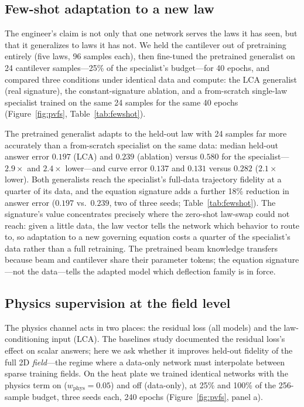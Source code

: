 \documentclass[11pt,a4paper]{article}
\begin{document}
\subsection{Few-shot adaptation to a new law}\label{sec:fewshot}

The engineer's claim is not only that one network serves the laws it has
seen, but that it generalizes to laws it has not. We held the cantilever
out of pretraining entirely (five laws, 96 samples each), then fine-tuned
the pretrained generalist on 24 cantilever samples---25\% of the
specialist's budget---for 40 epochs, and compared three conditions under
identical data and compute: the LCA generalist (real signature), the
constant-signature ablation, and a from-scratch single-law specialist
trained on the same 24 samples for the same 40 epochs
(Figure~\ref{fig:pvfs}, Table~\ref{tab:fewshot}).

The pretrained generalist adapts to the held-out law with 24 samples far
more accurately than a from-scratch specialist on the same data: median
held-out answer error $0.197$ (LCA) and $0.239$ (ablation) versus $0.580$
for the specialist---$2.9\times$ and $2.4\times$ lower---and curve error
$0.137$ and $0.131$ versus $0.282$ ($2.1\times$ lower). Both generalists
reach the specialist's full-data trajectory fidelity at a quarter of its
data, and the equation signature adds a further 18\% reduction in answer
error ($0.197$ vs.\ $0.239$, two of three seeds; Table~\ref{tab:fewshot}).
The signature's value concentrates precisely where the zero-shot law-swap
could not reach: given a little data, the law vector tells the network
which behavior to route to, so adaptation to a new governing equation costs
a quarter of the specialist's data rather than a full retraining. The
pretrained beam knowledge transfers because beam and cantilever share their
parameter tokens; the equation signature---not the data---tells the adapted
model which deflection family is in force.

\subsection{Physics supervision at the field level}\label{sec:physvdata}

The physics channel acts in two places: the residual loss (all models) and
the law-conditioning input (LCA). The baselines study documented the
residual loss's effect on scalar answers; here we ask whether it improves
held-out fidelity of the full 2D \emph{field}---the regime where a
data-only network must interpolate between sparse training fields. On the
heat plate we trained identical networks with the physics term on
($w_{\mathrm{phys}}=0.05$) and off (data-only), at 25\% and 100\% of the
256-sample budget, three seeds each, 240 epochs
(Figure~\ref{fig:pvfs}, panel a).
\end{document}
